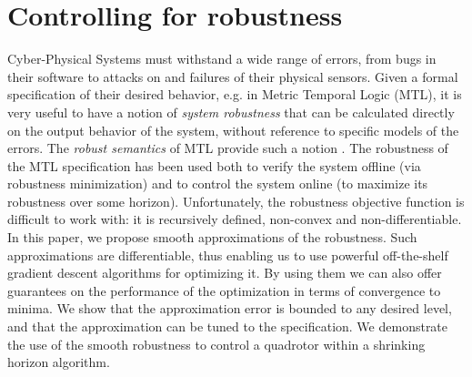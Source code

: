 \section{Controlling for robustness}
\label{sec:intro}
Cyber-Physical Systems must withstand a wide range of errors, from bugs in their software to attacks on and failures of their physical sensors.
Given a formal specification of their desired behavior, e.g. in Metric Temporal Logic (MTL), it is very useful to have a notion of \textit{system robustness} that can be calculated directly on the output behavior of the system, without reference to specific models of the errors.
The \textit{robust semantics} of MTL provide such a notion \cite{FainekosGP06formats}.
The robustness of the MTL specification has been used both to verify the system offline (via robustness minimization) and to control the system online (to maximize its robustness over some horizon).
Unfortunately, the robustness objective function is difficult to work with: it is recursively defined, non-convex and non-differentiable.
In this paper, we propose smooth approximations of the robustness. 
Such approximations are differentiable, thus enabling us to use powerful off-the-shelf gradient descent algorithms for optimizing it.
By using them we can also offer guarantees on the performance of the optimization in terms of convergence to minima.
We show that the approximation error is bounded to any desired level, and that the approximation can be tuned to the specification.
We demonstrate the use of the smooth robustness to control a quadrotor within a shrinking horizon algorithm. 

